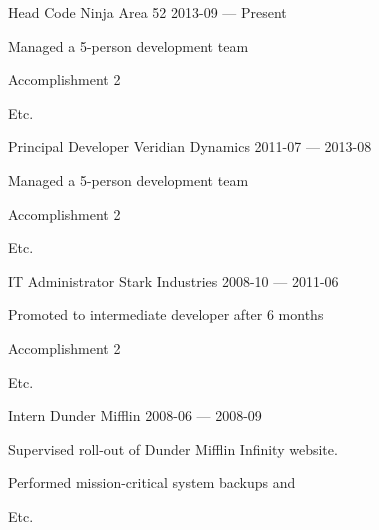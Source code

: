 


\begin{cventries}

  \cventry
    {Head Code Ninja} %
    {Area 52} %
    {} %
    {2013-09 — Present} %
    {
      \begin{cvitems} %
        \item {Managed a 5-person development team}
        \item {Accomplishment 2}
        \item {Etc.}
      \end{cvitems}
    }


  \cventry
    {Principal Developer} %
    {Veridian Dynamics} %
    {} %
    {2011-07 — 2013-08} %
    {
      \begin{cvitems} %
        \item {Managed a 5-person development team}
        \item {Accomplishment 2}
        \item {Etc.}
      \end{cvitems}
    }


  \cventry
    {IT Administrator} %
    {Stark Industries} %
    {} %
    {2008-10 — 2011-06} %
    {
      \begin{cvitems} %
        \item {Promoted to intermediate developer after 6 months}
        \item {Accomplishment 2}
        \item {Etc.}
      \end{cvitems}
    }


  \cventry
    {Intern} %
    {Dunder Mifflin} %
    {} %
    {2008-06 — 2008-09} %
    {
      \begin{cvitems} %
        \item {Supervised roll-out of Dunder Mifflin Infinity website.}
        \item {Performed mission-critical system backups and }
        \item {Etc.}
      \end{cvitems}
    }


\end{cventries}


